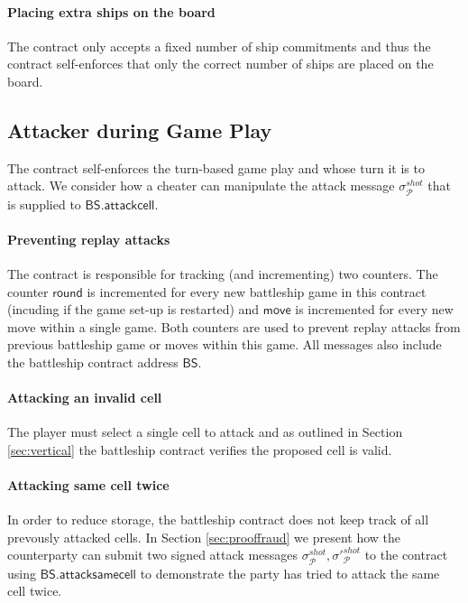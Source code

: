 \documentclass{llncs}
\newcommand{\participant}{\mathcal{P}}
\newcommand{\battleship}{\mathsf{BS}}
\newcommand{\battleshipattackcell}{\mathsf{BS.attackcell}}
\newcommand{\battleshipsamecell}{\mathsf{BS.attacksamecell}}
\begin{document}
	\paragraph{Placing extra ships on the board} 
	The contract only accepts a fixed number of ship commitments and thus the contract self-enforces that only the correct number of ships are placed on the board. 
	
	\subsection{Attacker during Game Play} 
	
	The contract self-enforces the turn-based game play and whose turn it is to attack.
	We consider how a cheater can manipulate the attack message $\sigma^{shot}_{\participant}$ that is supplied to $\battleshipattackcell$. 
	
	\paragraph{Preventing replay attacks}
	The contract is responsible for tracking (and incrementing) two counters. 
	The counter $\mathsf{round}$ is incremented for every new battleship game in this contract (incuding if the game set-up is restarted) and $\mathsf{move}$ is incremented for every new move within a single game. 
	Both counters are used to prevent replay attacks from previous battleship game or moves within this game. 
	All messages also include the battleship contract address $\battleship$.
	
	\paragraph{Attacking an invalid cell}
	The player must select a single cell to attack and as outlined in Section \ref{sec:vertical} the battleship contract verifies the proposed cell is valid. 
	
	\paragraph{Attacking same cell twice} 
	In order to reduce storage, the battleship contract does not keep track of all prevously attacked cells. 
	In Section \ref{sec:prooffraud} we present how the counterparty can submit two signed attack messages $\sigma^{shot}_{\participant},\sigma'^{shot}_{\participant}$ to the contract using $\battleshipsamecell$ to demonstrate the party has tried to attack the same cell twice. 
	
\end{document}
